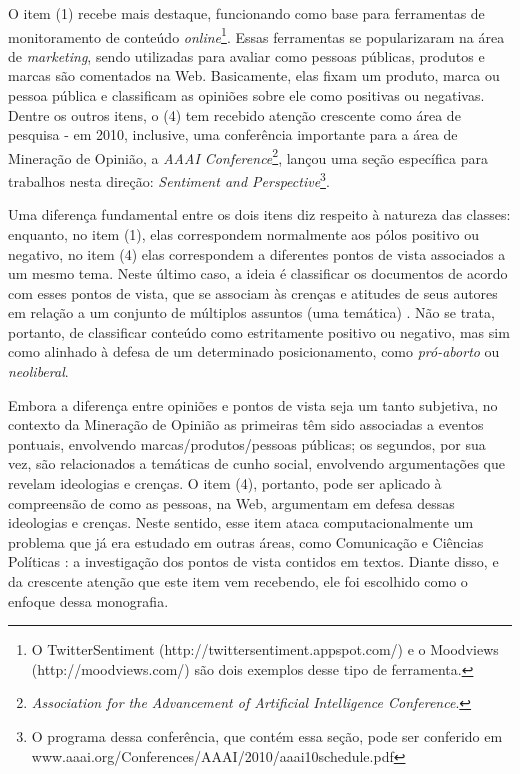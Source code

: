 O item (1) recebe mais destaque, funcionando como base para ferramentas de monitoramento de conteúdo \emph{online}\footnote{O TwitterSentiment (http://twittersentiment.appspot.com/) e o Moodviews (http://moodviews.com/) são dois exemplos desse tipo de ferramenta.}. Essas ferramentas se popularizaram na área de \emph{marketing}, sendo utilizadas para avaliar como pessoas públicas, produtos e marcas são comentados na Web. Basicamente, elas fixam um produto, marca ou pessoa pública e classificam as opiniões sobre ele como positivas ou negativas. Dentre os outros itens, o (4) tem recebido  atenção crescente como área de pesquisa - em 2010, inclusive, uma conferência importante para a área de Mineração de Opinião, a \emph{AAAI  Conference}\footnote{\emph{Association for the Advancement of Artificial Intelligence Conference}.}, lançou uma seção específica para trabalhos nesta direção: \emph{Sentiment and Perspective}\footnote{O programa dessa conferência, que contém essa seção, pode ser conferido em www.aaai.org/Conferences/AAAI/2010/aaai10schedule.pdf}. 

Uma diferença fundamental entre os dois itens diz respeito à natureza das classes: enquanto, no item (1), elas correspondem normalmente aos pólos positivo ou negativo, no item (4) elas correspondem a diferentes pontos de vista associados a um mesmo tema. Neste último caso, a ideia é classificar os documentos de acordo com esses pontos de vista, que se associam às crenças e atitudes de seus autores em relação a um conjunto de múltiplos assuntos (uma temática) \cite{omsa}. Não se trata, portanto, de classificar conteúdo como estritamente positivo ou negativo, mas sim como alinhado à defesa de um determinado posicionamento, como \emph{pró-aborto} ou \emph{neoliberal}. 

Embora a diferença entre opiniões e pontos de vista seja um tanto subjetiva, no contexto da Mineração de Opinião as primeiras têm sido associadas a eventos pontuais, envolvendo marcas/produtos/pessoas públicas; os segundos, por sua vez, são relacionados a temáticas de cunho social, envolvendo argumentações que revelam ideologias e crenças. O item (4), portanto, pode ser aplicado à compreensão de como as pessoas, na Web, argumentam em defesa dessas ideologias e crenças. Neste sentido, esse item ataca computacionalmente um problema que já era estudado em outras áreas, como Comunicação e Ciências Políticas \cite{gentzkow, milyo, fader}: a investigação dos pontos de vista contidos em textos. Diante disso, e da crescente atenção que este item vem recebendo, ele foi escolhido como o enfoque dessa monografia. 

